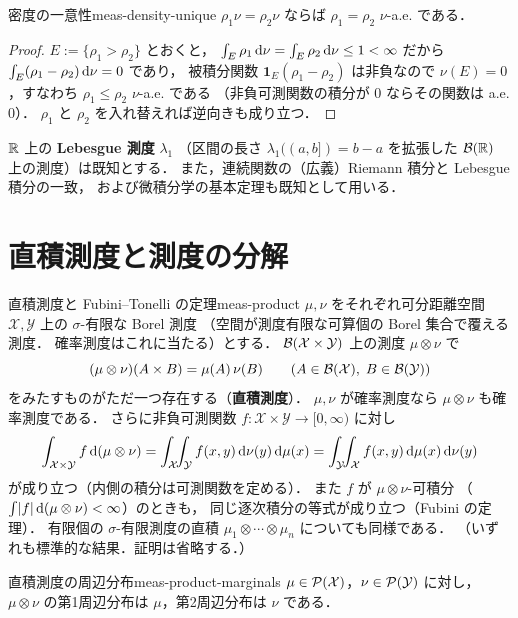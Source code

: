\begin{claim}{密度の一意性}{meas-density-unique}
  $\rho_1\nu=\rho_2\nu$ ならば $\rho_1=\rho_2$ $\nu$-a.e. である．
\end{claim}

\begin{proof}
  $E:=\{\rho_1>\rho_2\}$ とおくと，
  $\int_E\rho_1\,\mathrm{d}\nu=\int_E\rho_2\,\mathrm{d}\nu\leq1<\infty$ だから
  $\int_E(\rho_1-\rho_2)\,\mathrm{d}\nu=0$ であり，
  被積分関数 $\mathbf{1}_E(\rho_1-\rho_2)$ は非負なので
  $\nu(E)=0$，すなわち $\rho_1\leq\rho_2$ $\nu$-a.e. である
  （非負可測関数の積分が $0$ ならその関数は a.e. $0$）．
  $\rho_1$ と $\rho_2$ を入れ替えれば逆向きも成り立つ．
\end{proof}

$\mathbb{R}$ 上の \textbf{Lebesgue 測度} $\lambda_1$
（区間の長さ $\lambda_1((a,b])=b-a$ を拡張した
$\mathcal{B}(\mathbb{R})$ 上の測度）は既知とする．
また，連続関数の（広義）Riemann 積分と Lebesgue 積分の一致，
および微積分学の基本定理も既知として用いる．

\section{直積測度と測度の分解}

\begin{theorem}{直積測度と Fubini--Tonelli の定理}{meas-product}
  $\mu,\nu$ をそれぞれ可分距離空間 $\mathcal{X},\mathcal{Y}$ 上の
  $\sigma$-有限な Borel 測度
  （空間が測度有限な可算個の Borel 集合で覆える測度．
  確率測度はこれに当たる）とする．
  $\mathcal{B}(\mathcal{X}\times \mathcal{Y})$ 上の測度 $\mu\otimes\nu$ で
  \[
    (\mu\otimes\nu)(A\times B)=\mu(A)\,\nu(B)
    \qquad(A\in\mathcal{B}(\mathcal{X}),\;B\in\mathcal{B}(\mathcal{Y}))
  \]
  をみたすものがただ一つ存在する（\textbf{直積測度}）．
  $\mu,\nu$ が確率測度なら $\mu\otimes\nu$ も確率測度である．
  さらに非負可測関数 $f\colon \mathcal{X}\times \mathcal{Y}\to[0,\infty)$ に対し
  \[
    \int_{\mathcal{X}\times \mathcal{Y}}f\,\mathrm{d}(\mu\otimes\nu)
    =\int_{\mathcal{X}}\!\!\int_{\mathcal{Y}} f(x,y)\,\mathrm{d}\nu(y)\,\mathrm{d}\mu(x)
    =\int_{\mathcal{Y}}\!\!\int_{\mathcal{X}} f(x,y)\,\mathrm{d}\mu(x)\,\mathrm{d}\nu(y)
  \]
  が成り立つ（内側の積分は可測関数を定める）．
  また $f$ が $\mu\otimes\nu$-可積分
  （$\int\lvert f \rvert\,\mathrm{d}(\mu\otimes\nu)<\infty$）のときも，
  同じ逐次積分の等式が成り立つ（Fubini の定理）．
  有限個の $\sigma$-有限測度の直積
  $\mu_1\otimes\cdots\otimes\mu_n$ についても同様である．
  （いずれも標準的な結果．証明は省略する．）
\end{theorem}

\begin{claim}{直積測度の周辺分布}{meas-product-marginals}
  $\mu\in\mathcal{P}(\mathcal{X})$，$\nu\in\mathcal{P}(\mathcal{Y})$ に対し，
  $\mu\otimes\nu$ の第1周辺分布は $\mu$，第2周辺分布は $\nu$ である．
\end{claim}

